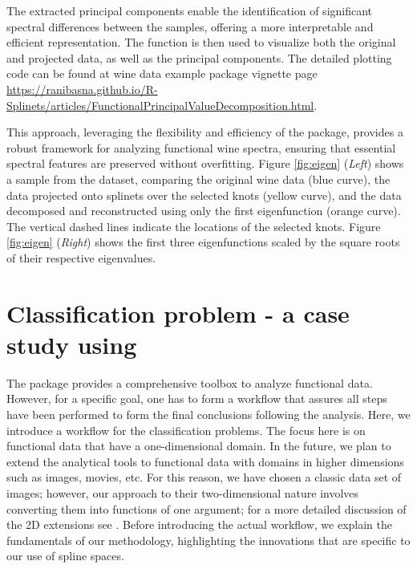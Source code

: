 The extracted principal components enable the identification of significant spectral differences between the samples, offering a more interpretable and efficient representation. The  function is then used to visualize both the original and projected data, as well as the principal components. The detailed plotting code can be found at { wine data example package vignette page } \url{https://ranibasna.github.io/R-Splinets/articles/FunctionalPrincipalValueDecomposition.html}.

This approach, leveraging the flexibility and efficiency of the  package, provides a robust framework for analyzing functional wine spectra, ensuring that essential spectral features are preserved without overfitting.
Figure \ref{fig:eigen} (\emph{Left})  shows a sample from the dataset, comparing the original wine data (blue curve), the data projected onto splinets over the selected knots (yellow curve), and the data decomposed and reconstructed using only the first eigenfunction (orange curve). The vertical dashed lines indicate the locations of the selected knots. Figure \ref{fig:eigen} (\emph{Right})  shows the first three eigenfunctions scaled by the square roots of their respective eigenvalues.

\vspace{-.13cm}
\section{Classification problem - a case study using  }
\vspace{-.22cm}
The package   provides a comprehensive toolbox to analyze functional data. 
However, for a specific goal, one has to form a workflow that assures all steps have been performed to form the final conclusions following the analysis. 
Here, we introduce a workflow for the classification problems.
The focus here is on functional data that have a one-dimensional domain. 
In the future, we plan to extend the analytical tools to functional data with domains in higher dimensions such as images, movies, etc. 
For this reason, we have chosen a classic data set of images; however, our approach to their two-dimensional nature involves converting them into functions of one argument; for a more detailed discussion of the 2D extensions see \citep{Basna:2024aa}.
Before introducing the actual workflow, we explain the fundamentals of our methodology, highlighting the innovations that are specific to our use of spline spaces. 

